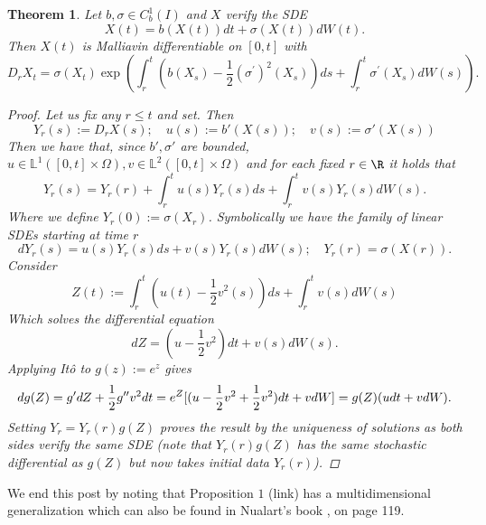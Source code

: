 \documentclass[12pt]{article}
\newtheorem{theorem}{Theorem}
\begin{document}
\begin{theorem}
	Let $b,\sigma \in C^1_b(I)$ and $X$ verify  the SDE
	\begin{equation*}
		X(t)=b(X(t))d t +\sigma(X(t)) dW(t).
	\end{equation*}
	Then $X(t)$ is Malliavin differentiable on $[0,t]$ with
	\begin{equation*}
		D_r X_t=\sigma\left(X_t\right) \exp \left(\int_r^t\left(b\left(X_s\right)-\frac{1}{2}\left(\sigma^{\prime}\right)^2\left(X_s\right)\right) d s+\int_r^t \sigma^{\prime}\left(X_s\right) d W(s)\right).
	\end{equation*}
	\begin{proof}
		Let us fix any $r\leq t$ and set. Then
		\begin{equation*}
			Y_r(s):=D_rX(s);\quad  u(s):=b'(X(s));\quad v(s):=\sigma'(X(s))
		\end{equation*}
		Then we have that, since $b',\sigma '$ are bounded, $u\in \mathbb{L}^1([0,t]\times\Omega),v\in \mathbb{L}^2([0,t]\times\Omega)$ and for each fixed $r\in  \R$ it holds that
		\begin{equation*}
			Y_r(s)=Y_r(r)+\int_{r}^t u(s)Y_r(s) ds+\int_{r}^t v(s)Y_r(s)  dW(s) .
		\end{equation*}
		Where we define $Y_r(0):=\sigma (X_r)$. Symbolically we have the family of linear SDEs starting at time $r$
		\begin{equation*}
			dY_r(s)=u(s)Y_r(s) ds+v(s)Y_r(s)  dW(s);\quad Y_r(r)=\sigma(X(r)).
		\end{equation*}
		Consider
		\begin{equation*}
			Z(t):=\int_r^t\left(u(t)-\frac{1}{2}v^2(s)\right) d s+\int_r^t v(s) d W(s)
		\end{equation*}
		Which solves the differential equation
		\begin{equation*}
			dZ=\left(u-\frac{1}{2}v^2\right)d t+v(s)dW(s) .
		\end{equation*}
		Applying Itô to  $g(z):=e^z$ gives
		\begin{equation*}
			d g(Z)=g'dZ+\frac{1}{2}g''v^2d t= e^Z[(u-\frac{1}{2}v^2+\frac{1}{2}v^2)d t+vdW]\\=
			g(Z)(u d t +vdW).
		\end{equation*}
		Setting $Y_r=Y_r(r)g(Z)$ proves the result by the uniqueness of solutions as both sides verify the same SDE (note that  $Y_r(r)g(Z)$ has the same stochastic differential as $g(Z)$ but now takes initial data  $Y_r(r)$).
	\end{proof}
\end{theorem}
We end this post by noting that  Proposition $1$ (link) has a multidimensional generalization which can also be found in Nualart's book \cite{nualart2018introduction}, on page 119.


\end{document}
